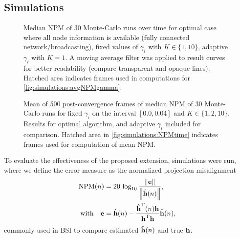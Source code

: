 \documentclass{article}
\begin{document}
\subsection[]{Simulations}
\begin{figure}[t]
    \centering
    
    \vspace*{-0.6cm}
    \caption[]{Median NPM of 30 Monte-Carlo runs over time for optimal case where all node information is available (fully connected network/broadcasting), fixed values of \(\gamma_i\) with \(K \in \{1,10\}\), adaptive \(\gamma_i\) with \(K=1\). A moving average filter was applied to result curves for better readability (compare transparent and opaque lines). Hatched area indicates frames used in computations for \autoref{fig:simulations:avgNPMgamma}.}
    \label{fig:simulations:NPMtime}
\end{figure}
\begin{figure}[t]
    \centering
    
    \vspace*{-0.6cm}
    \caption[]{Mean of 500 post-convergence frames of median NPM of 30 Monte-Carlo runs for fixed \(\gamma_i\) on the interval \([0.0, 0.04]\) and \(K \in \{1,2,10\}\). Results for optimal algorithm, and adaptive \(\gamma_i\) included for comparison. Hatched area in \autoref{fig:simulations:NPMtime} indicates frames used for computation of mean NPM.}
    \label{fig:simulations:avgNPMgamma}
\end{figure}
To evaluate the effectiveness of the proposed extension, simulations were run, where we define the error measure as the normalized projection misalignment
\begin{equation}
    \begin{aligned}
        \text{NPM}(n) &= 20\,\log_{10} \frac{\left\| \bm{\mathrm{e}} \right\|}{\left\|\hat{\bm{\mathrm{h}}}(n)\right\|},\\
        \text{with}\quad \bm{\mathrm{e}} &= \hat{\bm{\mathrm{h}}}(n) - \frac{\hat{\bm{\mathrm{h}}}^{\mathrm{T}} (n) \bm{\mathrm{h}}}{\bm{\mathrm{h}}^{\mathrm{T}} \bm{\mathrm{h}}}\hat{\bm{\mathrm{h}}}(n),
    \end{aligned}
\end{equation}
commonly used in BSI to compare estimated \(\hat{\bm{\mathrm{h}}}(n)\) and true \(\bm{\mathrm{h}}\).
\end{document}

